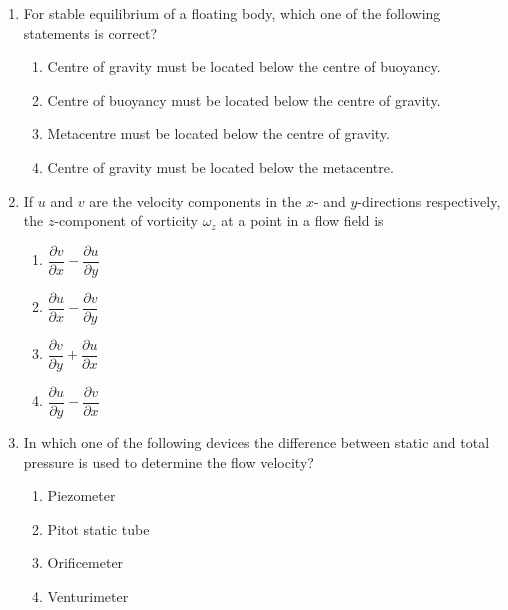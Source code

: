 \documentclass[journal,12pt,onecolumn]{IEEEtran}
\begin{document}
\begin{enumerate}[label=\arabic*)]
\item For stable equilibrium of a floating body, which one of the following statements is correct?
\hfill{} \\

\vspace{0.2cm}
\begin{enumerate}[label=\alph*)]
\item Centre of gravity must be located below the centre of buoyancy.
\item Centre of buoyancy must be located below the centre of gravity.
\item Metacentre must be located below the centre of gravity.
\item Centre of gravity must be located below the metacentre.
\end{enumerate}

\vspace{0.5cm}

\item If $u$ and $v$ are the velocity components in the $x$- and $y$-directions respectively, the $z$-component of vorticity $\omega_z$ at a point in a flow field is
\hfill{} \\

\vspace{0.2cm}
\begin{enumerate}[label=\alph*)]
\item $\dfrac{\partial v}{\partial x}-\dfrac{\partial u}{\partial y}$
\item $\dfrac{\partial u}{\partial x}-\dfrac{\partial v}{\partial y}$
\item $\dfrac{\partial v}{\partial y}+\dfrac{\partial u}{\partial x}$
\item $\dfrac{\partial u}{\partial y}-\dfrac{\partial v}{\partial x}$
\end{enumerate}

\vspace{0.5cm}

\item In which one of the following devices the difference between static and total pressure is used to determine the flow velocity?
\hfill{} \\

\vspace{0.2cm}
\begin{enumerate}[label=\alph*)]
\item Piezometer
\item Pitot static tube
\item Orificemeter
\item Venturimeter
\end{enumerate}


\end{enumerate}
\end{document}
